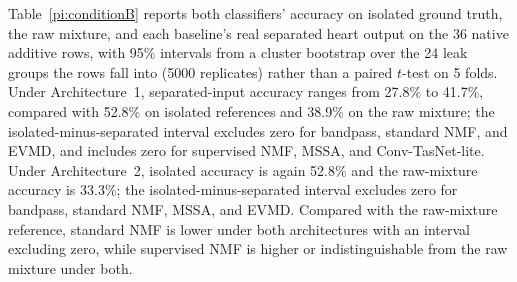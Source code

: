 \documentclass[journal]{IEEEtran}
\begin{document}
Table~\ref{pi:conditionB} reports both classifiers' accuracy on isolated ground truth, the raw mixture, and each baseline's real separated heart output on the 36 native additive rows, with 95\% intervals from a cluster bootstrap over the 24 leak groups the rows fall into (5000 replicates) rather than a paired $t$-test on 5 folds. Under Architecture~1, separated-input accuracy ranges from 27.8\% to 41.7\%, compared with 52.8\% on isolated references and 38.9\% on the raw mixture; the isolated-minus-separated interval excludes zero for bandpass, standard NMF, and EVMD, and includes zero for supervised NMF, MSSA, and Conv-TasNet-lite. Under Architecture~2, isolated accuracy is again 52.8\% and the raw-mixture accuracy is 33.3\%; the isolated-minus-separated interval excludes zero for bandpass, standard NMF, MSSA, and EVMD. Compared with the raw-mixture reference, standard NMF is lower under both architectures with an interval excluding zero, while supervised NMF is higher or indistinguishable from the raw mixture under both.
\end{document}
